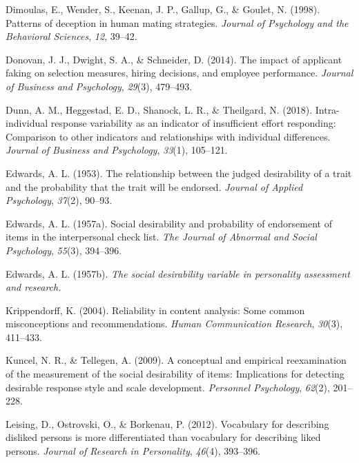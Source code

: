 \documentclass[
  ,jou]{apa6}
\newlength{\cslhangindent}
\newlength{\cslentryspacingunit} %
\newenvironment{CSLReferences}[2] %
 {%
  \setlength{\parindent}{0pt}
  \ifodd #1
  \let\oldpar\par
  \def\par{\hangindent=\cslhangindent\oldpar}
  \fi
  \setlength{\parskip}{#2\cslentryspacingunit}
 }%
 {}
\begin{document}
\begin{CSLReferences}{1}{0}
\leavevmode{}%
Dimoulas, E., Wender, S., Keenan, J. P., Gallup, G., \& Goulet, N. (1998). Patterns of deception in human mating strategies. \emph{Journal of Psychology and the Behavioral Sciences}, \emph{12}, 39--42.

\leavevmode{}%
Donovan, J. J., Dwight, S. A., \& Schneider, D. (2014). The impact of applicant faking on selection measures, hiring decisions, and employee performance. \emph{Journal of Business and Psychology}, \emph{29}(3), 479--493.

\leavevmode{}%
Dunn, A. M., Heggestad, E. D., Shanock, L. R., \& Theilgard, N. (2018). Intra-individual response variability as an indicator of insufficient effort responding: Comparison to other indicators and relationships with individual differences. \emph{Journal of Business and Psychology}, \emph{33}(1), 105--121.

\leavevmode{}%
Edwards, A. L. (1953). The relationship between the judged desirability of a trait and the probability that the trait will be endorsed. \emph{Journal of Applied Psychology}, \emph{37}(2), 90--93.

\leavevmode{}%
Edwards, A. L. (1957a). Social desirability and probability of endorsement of items in the interpersonal check list. \emph{The Journal of Abnormal and Social Psychology}, \emph{55}(3), 394--396.

\leavevmode{}%
Edwards, A. L. (1957b). \emph{The social desirability variable in personality assessment and research.}

\leavevmode{}%
Krippendorff, K. (2004). Reliability in content analysis: Some common misconceptions and recommendations. \emph{Human Communication Research}, \emph{30}(3), 411--433.

\leavevmode{}%
Kuncel, N. R., \& Tellegen, A. (2009). A conceptual and empirical reexamination of the measurement of the social desirability of items: Implications for detecting desirable response style and scale development. \emph{Personnel Psychology}, \emph{62}(2), 201--228.

\leavevmode{}%
Leising, D., Ostrovski, O., \& Borkenau, P. (2012). Vocabulary for describing disliked persons is more differentiated than vocabulary for describing liked persons. \emph{Journal of Research in Personality}, \emph{46}(4), 393--396.


\end{CSLReferences}
\end{document}
